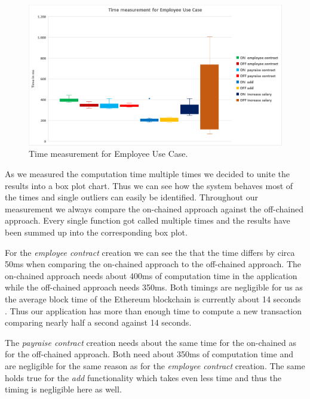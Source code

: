 \begin{figure}[t]%
\centering
\includegraphics[width=1.0\textwidth]{images/05_evaluation/05_time.png}
\caption{\label{fig:05_time}Time measurement for Employee Use Case.}
\end{figure}

As we measured the computation time multiple times we decided to unite the results into a box plot chart. Thus we can see how the system behaves most of the times and single outliers can easily be identified. Throughout our measurement we always compare the on-chained approach against the off-chained approach. Every single function got called multiple times and the results have been summed up into the corresponding box plot.

For the \textit{employee contract} creation we can see the that the time differs by circa 50ms when comparing the on-chained approach to the off-chained approach. The on-chained approach needs about 400ms of computation time in the application while the off-chained approach needs 350ms. Both timings are negligible for us as the average block time of the Ethereum blockchain is currently about 14 seconds \cite{etherscan_blocktime}. Thus our application has more than enough time to compute a new transaction comparing nearly half a second against 14 seconds.

The \textit{payraise contract} creation needs about the same time for the on-chained as for the off-chained approach. Both need about 350ms of computation time and are negligible for the same reason as for the \textit{employee contract} creation. The same holds true for the \textit{add} functionality which takes even less time and thus the timing is negligible here as well.

